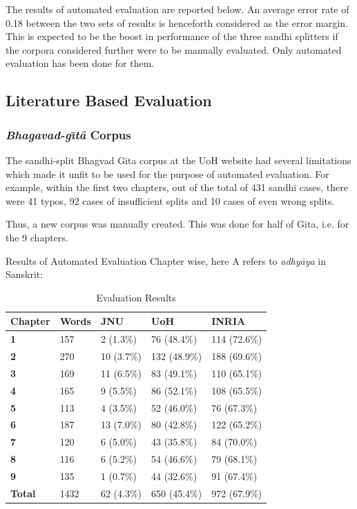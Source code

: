 \documentclass[11pt]{article}
\begin{document}
The results of automated evaluation are reported below. An average error rate of 0.18 between the two sets of results is henceforth  considered as the error margin. This is expected to be the boost in performance of the three sandhi splitters if the corpora considered further were to be manually evaluated. Only automated evaluation has been done for them.


\subsection{Literature Based Evaluation}

\subsubsection{\textit{Bhagavad-g\={\i}t\={a}} Corpus}

The sandhi-split Bhagvad Gita corpus at the UoH website had several limitations which made it unfit to be used for the purpose of automated evaluation. For example, within the first two chapters, out of the total of 431 sandhi cases, there were 41 typos, 92 cases of insufficient splits and 10 cases of even wrong splits.

Thus, a new corpus was manually created. This was done for half of Gita, i.e. for the 9 chapters.


Results of Automated Evaluation Chapter wise, here A refers to \textit{adhy\={a}ya} in Sanskrit:

\begin{table}[t]
\begin{center}
\begin{tabular}{|p{1.2cm} | p{1cm}|p{1cm} | p{1.2cm} | p{1.2cm}|}
\hline 
 \bf Chapter & \bf Words & \bf JNU & \bf UoH & \bf INRIA \\ 
 \hline
 
\bf	1	&	157	&	2	(1.3\%)	&	76	(48.4\%)	&	114	(72.6\%)	\\	\hline
\bf	2	&	270	&	10	(3.7\%)	&	132	(48.9\%)	&	188	(69.6\%)	\\	\hline
\bf	3	&	169	&	11	(6.5\%)	&	83	(49.1\%)	&	110	(65.1\%)	\\	\hline
\bf	4	&	165	&	9	(5.5\%)	&	86	(52.1\%)	&	108	(65.5\%)	\\	\hline
\bf	5	&	113	&	4	(3.5\%)	&	52	(46.0\%)	&	76	(67.3\%)	\\	\hline
\bf	6	&	187	&	13	(7.0\%)	&	80	(42.8\%)	&	122	(65.2\%)	\\	\hline
\bf	7	&	120	&	6	(5.0\%)	&	43	(35.8\%)	&	84	(70.0\%)	\\	\hline
\bf	8	&	116	&	6	(5.2\%)	&	54	(46.6\%)	&	79	(68.1\%)	\\	\hline
\bf	9	&	135	&	1	(0.7\%)	&	44	(32.6\%)	&	91	(67.4\%)	\\	\hline
\bf	Total	&	1432	&	62	(4.3\%)	&	650	(45.4\%)	&	972	(67.9\%)	\\	\hline

\end{tabular}
\end{center}
\caption{\label{font-table} Evaluation Results }
\end{table}
\end{document}
